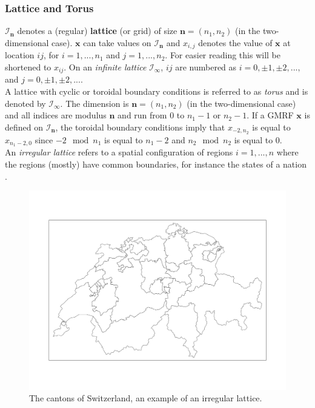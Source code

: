 \subsubsection*{Lattice and Torus}
$\mathcal{I}_{\pmb{n}}$ denotes a (regular) \textbf{lattice} (or grid) of size $\pmb{n}=\left(n_1, n_2\right)$ (in the two-dimensional case). $\pmb{x}$ can take values on $\mathcal{I}_{\pmb{n}}$ and $x_{i,j}$ denotes the value of $\pmb{x}$ at location $ij$, for $i=1,...,n_1$ and $j=1,...,n_2$. For easier reading this will be shortened to $x_{ij}$. On an \textit{infinite lattice} $\mathcal{I}_{\pmb{\infty}}$, $ij$ are numbered as $i=0,\pm1,\pm2,...,$ and $j=0,\pm1,\pm2,...$. \\
A lattice with cyclic or toroidal boundary conditions is referred to as \textit{torus} and is denoted by $\mathcal{I}_{\pmb{\infty}}$. The dimension is $\pmb{n}=\left(n_1,n_2\right)$ (in the two-dimensional case) and all indices are modulus $\pmb{n}$ and run from 0 to $n_1-1$ or $n_2-1$. If a GMRF $\pmb{x}$ is defined on $\mathcal{I}_{\pmb{n}}$, the toroidal boundary conditions imply that $x_{-2,n_2}$ is equal to $x_{n_1-2,0}$ since $-2\mod n_1$ is equal to $n_1-2$ and $n_2\mod n_2$ is equal to 0.\\
An \textit{irregular lattice} refers to a spatial configuration of regions $i=1,...,n$ where the regions (mostly) have common boundaries, for instance the states of a nation \autocite[][15--16]{rue2005gaussian}.
\begin{figure}[H]
   \centering
       \includegraphics[page=1,width=.7\textwidth]{switzerland.pdf}
 \caption{The cantons of Switzerland, an example of an irregular lattice.}
 \label{fig:lattice}
\end{figure}
